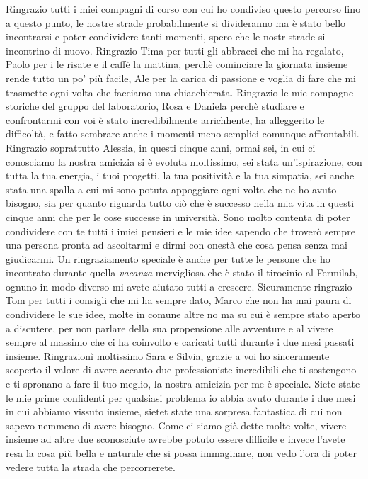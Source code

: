 Ringrazio tutti i miei compagni di corso con cui ho condiviso questo percorso fino a questo punto, le nostre strade probabilmente si divideranno ma è stato bello incontrarsi e poter condividere tanti momenti, spero che le nostr strade si incontrino di nuovo.
Ringrazio Tima per tutti gli abbracci che mi ha regalato, Paolo per i le risate e il caffè la mattina, perchè cominciare la giornata insieme rende tutto un po' più facile, Ale per la carica di passione e voglia di fare che mi trasmette ogni volta che facciamo una chiacchierata.
Ringrazio le mie compagne storiche del gruppo del laboratorio, Rosa e Daniela perchè studiare e confrontarmi con voi è stato incredibilmente arrichhente, ha alleggerito le difficoltà, e fatto sembrare anche i momenti meno semplici comunque affrontabili. 
Ringrazio soprattutto Alessia, in questi cinque anni, ormai sei, in cui ci conosciamo la nostra amicizia si è evoluta moltissimo, sei stata un'ispirazione, con tutta la tua energia, i tuoi progetti, la tua positività e la tua simpatia, sei anche stata una spalla a cui mi sono potuta appoggiare ogni volta che ne ho avuto bisogno,
sia per quanto riguarda tutto ciò che è successo nella mia vita in questi cinque anni che per le cose successe in università. Sono molto contenta di poter condividere con te tutti i imiei pensieri e le mie idee sapendo che troverò sempre una persona pronta ad ascoltarmi e dirmi con onestà che cosa pensa senza mai giudicarmi.
Un ringraziamento speciale è anche per tutte le persone che ho incontrato durante quella \textit{vacanza} mervigliosa che è stato il tirocinio al Fermilab, ognuno in modo diverso mi avete aiutato tutti a crescere.
Sicuramente ringrazio Tom per tutti i consigli che mi ha sempre dato, Marco che non ha mai paura di condividere le sue idee, molte in comune altre no ma su cui è sempre stato aperto a discutere, per non parlare della sua propensione alle avventure e al vivere sempre al massimo che ci ha coinvolto e caricati tutti durante i due mesi passati insieme.
Ringrazionì moltissimo Sara e Silvia, grazie a voi ho sinceramente scoperto il valore di avere accanto due professioniste incredibili che ti sostengono e ti spronano a fare il tuo meglio, la nostra amicizia per me è speciale. Siete state le mie prime confidenti per qualsiasi problema io abbia avuto durante i due mesi in cui abbiamo vissuto insieme, sietet state una sorpresa fantastica di cui non sapevo nemmeno di avere bisogno.
Come ci siamo già dette molte volte, vivere insieme ad altre due sconosciute avrebbe potuto essere difficile e invece l'avete resa la cosa più bella e naturale che si possa immaginare, non vedo l'ora di poter vedere tutta la strada che percorrerete.

